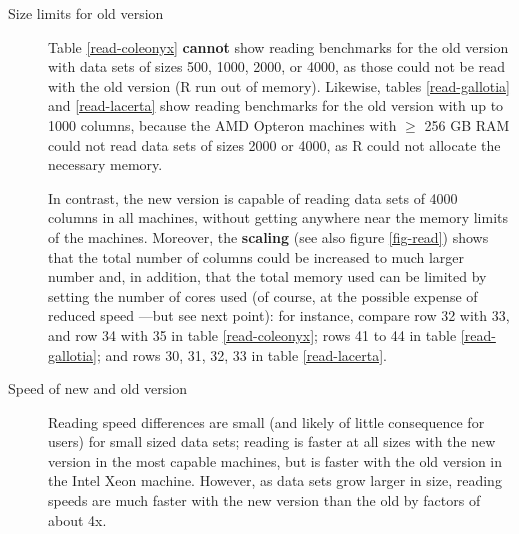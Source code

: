 \documentclass[a4paper,11pt]{article}
\begin{document}
\begin{description}
\item[Size limits for old version] Table
\ref{read-coleonyx} \textbf{cannot} show reading benchmarks for the old
version with data sets of sizes 500, 1000, 2000, or 4000, as those could
not be read with the old version (R run out of memory). Likewise, tables
\ref{read-gallotia} and \ref{read-lacerta} show reading benchmarks for the
old version with up to 1000 columns, because the AMD Opteron machines with
$\ge$ 256 GB RAM could not read data sets of sizes 2000 or
4000, as R could not allocate the necessary memory.%

In contrast, the new version is capable of reading data sets of 4000
columns in all machines, without getting anywhere near the memory limits
of the machines. Moreover, the \textbf{scaling} (see also figure
\ref{fig-read}) shows that the total number of columns could be increased
to much larger number and, in addition, that the total memory used can be
limited by setting the number of cores used (of course, at the possible
expense of reduced speed ---but see next point): for instance, compare row
32 with 33, and row 34 with 35 in table \ref{read-coleonyx}; rows 41 to 44
in table \ref{read-gallotia}; and rows 30, 31, 32, 33 in table
\ref{read-lacerta}.


\item[Speed of new and old version] Reading speed differences are small
  (and likely of little consequence for users) for small sized data sets;
  reading is faster at all sizes with the new version in the most capable
  machines, but is faster with the old version in the Intel Xeon
  machine. However, as data sets grow larger in size, reading speeds are
  much faster with the new version than the old by factors of about 4x.


\end{description}
\end{document}
